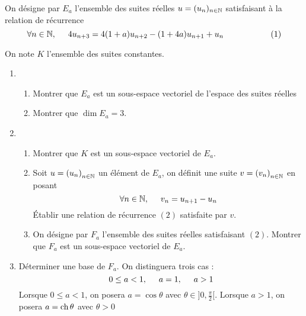 On d{\'e}signe par $E_a$ l'ensemble des suites r{\'e}elles $u=(u_n)_{n\in\mathbb{N} }$ satisfaisant {\`a} la relation de r{\'e}currence
 \begin{displaymath}
 \forall n\in \mathbb{N}, \hspace{0.5cm} 4u_{n+3}=4(1+a)u_{n+2}-(1+4a)u_{n+1}+u_n \hspace{2cm}(1)
 \end{displaymath}

 On note $K$ l'ensemble des suites constantes.
\begin{enumerate}
  \item \begin{enumerate}
     \item Montrer que $E_a$ est un sous-espace vectoriel de l'espace des suites r{\'e}elles
     \item Montrer que $\dim E_a =3$.
  \end{enumerate}

  \item \begin{enumerate}
     \item Montrer que $K$ est un sous-espace vectoriel de $E_a$.
     \item Soit $u=\left(u_n\right)_{n\in\mathbb{N}}$ un {\'e}l{\'e}ment de $E_a$, on d{\'e}finit une suite $v=\left(v_n\right)_{n\in\mathbb{N}}$ en posant
\begin{displaymath}
 \forall n\in \mathbb{N},\hspace{0.5cm} v_n=u_{n+1}-u_n
\end{displaymath}
{\'E}tablir une relation de r{\'e}currence $(2)$ satisfaite par $v$.
     \item On d{\'e}signe par $F_a$ l'ensemble des suites r{\'e}elles satisfaisant $(2)$. Montrer que $F_a$ est un sous-espace
     vectoriel de $E_a$.
  \end{enumerate}

  \item D{\'e}terminer une base de $F_a$. On distinguera trois cas :
\begin{displaymath}
 0\leq a <1 , \hspace{0.5cm} a=1 , \hspace{0.5cm} a>1
\end{displaymath}
Lorsque $0\leq a <1$, on posera $a=\cos \theta$ avec $\theta \in ]0,\frac{\pi}{2}[$.\newline
Lorsque $ a >1$, on posera $a=\operatorname{ch} \theta$ avec $\theta >0$


\end{enumerate}
